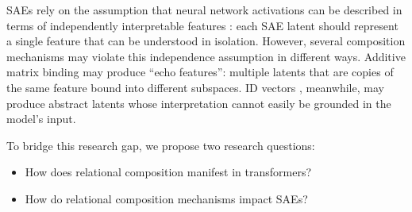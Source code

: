 SAEs rely on the assumption that neural network activations can be described in terms of independently interpretable features 
\citep{elhage2022toy}: each SAE latent should represent a single 
feature that can be understood in isolation. However, several 
composition mechanisms may violate this independence assumption in different ways. 
Additive matrix binding \citep{wattenberg2024relational} may produce ``echo features'': multiple latents that are copies of the same feature bound into different subspaces. ID vectors \citep{feng2023language}, meanwhile, may produce abstract latents whose interpretation cannot easily be grounded in the model's input. 

To bridge this research gap, we propose two research questions:

\begin{itemize}
    \item[RQ1] How does relational composition manifest in transformers?
    \item[RQ2] How do relational composition mechanisms impact SAEs?
\end{itemize}

